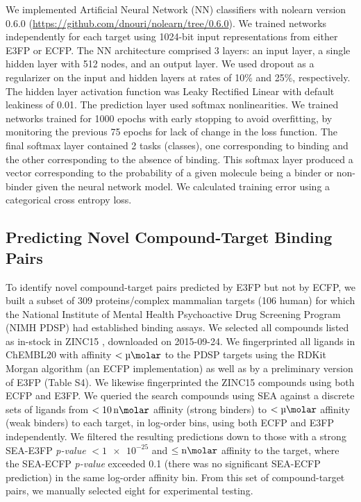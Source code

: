 \documentclass[../../main.tex]{subfiles}
\begin{document}
\begin{refsection}
	\clearpage %
	We implemented Artificial Neural Network (NN) classifiers with nolearn version 0.6.0 (\url{https://github.com/dnouri/nolearn/tree/0.6.0}).
	We trained networks independently for each target using 1024-bit input representations from either E3FP or ECFP.
	The NN architecture comprised 3 layers: an input layer, a single hidden layer with 512 nodes, and an output layer.
	We used dropout \supercite{srivastava_2014} as a regularizer on the input and hidden layers at rates of 10\% and 25\%, respectively.
	The hidden layer activation function was Leaky Rectified Linear \supercite{maas_2013} with default leakiness of 0.01.
	The prediction layer used softmax nonlinearities.
	We trained networks trained for 1000 epochs with early stopping to avoid overfitting, by monitoring the previous 75 epochs for lack of change in the loss function.
	The final softmax layer contained 2 tasks (classes), one corresponding to binding and the other corresponding to the absence of binding.
	This softmax layer produced a vector corresponding to the probability of a given molecule being a binder or non-binder given the neural network model.
	We calculated training error using a categorical cross entropy loss.

	\subsection*{Predicting Novel Compound-Target Binding Pairs}

	To identify novel compound-target pairs predicted by E3FP but not by ECFP, we built a subset of 309 proteins/complex mammalian targets (106 human) for which the National Institute of Mental Health Psychoactive Drug Screening Program (NIMH PDSP) \supercite{besnard_2012} had established binding assays.
	We selected all compounds listed as in-stock in ZINC15  \supercite{sterling_2015}, downloaded on 2015-09-24.
	We fingerprinted all ligands in ChEMBL20 \supercite{hersey_2015} with affinity $< \SI{}{\micro\molar}$ to the PDSP targets using the RDKit Morgan algorithm (an ECFP implementation) as well as by a preliminary version of E3FP (Table S4).
	We likewise fingerprinted the ZINC15 compounds using both ECFP and E3FP.
	We queried the search compounds using SEA against a discrete sets of ligands from $< \SI{10}{\nano\molar}$ affinity (strong binders) to   $< \SI{}{\micro\molar}$ affinity (weak binders) to each target, in log-order bins, using both ECFP and E3FP independently.
	We filtered the resulting predictions down to those with a strong SEA-E3FP \emph{p-value} $< \num{1e-25}$ and $\le \SI{}{\nano\molar}$ affinity to the target, where the SEA-ECFP \emph{p-value} exceeded 0.1 (\ie there was no significant SEA-ECFP prediction) in the same log-order affinity bin.
	From this set of compound-target pairs, we manually selected eight for experimental testing.


\end{refsection}
\end{document}
